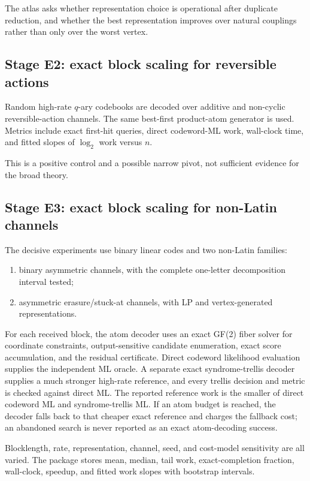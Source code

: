 \documentclass[11pt]{article}
\theoremstyle{definition}
\theoremstyle{remark}
\begin{document}
The atlas asks whether representation choice is operational after duplicate reduction, and whether the best representation improves over natural couplings rather than only over the worst vertex.

\subsection{Stage E2: exact block scaling for reversible actions}

Random high-rate $q$-ary codebooks are decoded over additive and non-cyclic reversible-action channels. The same best-first product-atom generator is used. Metrics include exact first-hit queries, direct codeword-ML work, wall-clock time, and fitted slopes of $\log_2$ work versus $n$.

This is a positive control and a possible narrow pivot, not sufficient evidence for the broad theory.

\subsection{Stage E3: exact block scaling for non-Latin channels}

The decisive experiments use binary linear codes and two non-Latin families:
\begin{enumerate}
\item binary asymmetric channels, with the complete one-letter decomposition interval tested;
\item asymmetric erasure/stuck-at channels, with LP and vertex-generated representations.
\end{enumerate}

For each received block, the atom decoder uses an exact GF(2) fiber solver for coordinate constraints, output-sensitive candidate enumeration, exact score accumulation, and the residual certificate. Direct codeword likelihood evaluation supplies the independent ML oracle. A separate exact syndrome-trellis decoder supplies a much stronger high-rate reference, and every trellis decision and metric is checked against direct ML. The reported reference work is the smaller of direct codeword ML and syndrome-trellis ML. If an atom budget is reached, the decoder falls back to that cheaper exact reference and charges the fallback cost; an abandoned search is never reported as an exact atom-decoding success.

Blocklength, rate, representation, channel, seed, and cost-model sensitivity are all varied. The package stores mean, median, tail work, exact-completion fraction, wall-clock, speedup, and fitted work slopes with bootstrap intervals.
\end{document}
